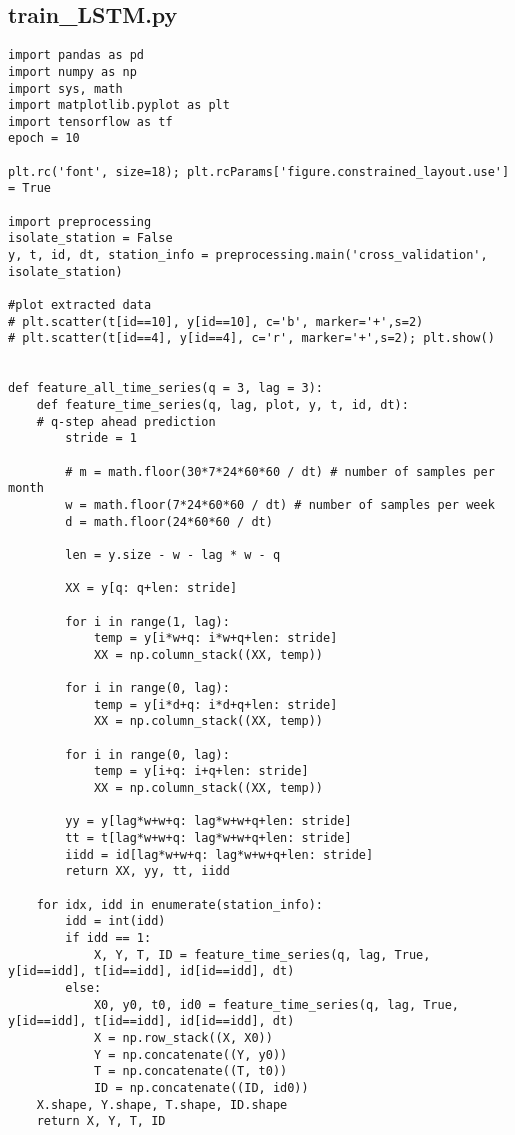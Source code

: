 \subsection{train\_LSTM.py}
\begin{lstlisting}
import pandas as pd
import numpy as np
import sys, math
import matplotlib.pyplot as plt
import tensorflow as tf
epoch = 10

plt.rc('font', size=18); plt.rcParams['figure.constrained_layout.use'] = True

import preprocessing
isolate_station = False
y, t, id, dt, station_info = preprocessing.main('cross_validation', isolate_station)

#plot extracted data
# plt.scatter(t[id==10], y[id==10], c='b', marker='+',s=2)
# plt.scatter(t[id==4], y[id==4], c='r', marker='+',s=2); plt.show()


def feature_all_time_series(q = 3, lag = 3):
    def feature_time_series(q, lag, plot, y, t, id, dt):
    # q-step ahead prediction
        stride = 1

        # m = math.floor(30*7*24*60*60 / dt) # number of samples per month
        w = math.floor(7*24*60*60 / dt) # number of samples per week
        d = math.floor(24*60*60 / dt)

        len = y.size - w - lag * w - q

        XX = y[q: q+len: stride]
            
        for i in range(1, lag):
            temp = y[i*w+q: i*w+q+len: stride]
            XX = np.column_stack((XX, temp))

        for i in range(0, lag):
            temp = y[i*d+q: i*d+q+len: stride]
            XX = np.column_stack((XX, temp))

        for i in range(0, lag):
            temp = y[i+q: i+q+len: stride]
            XX = np.column_stack((XX, temp))

        yy = y[lag*w+w+q: lag*w+w+q+len: stride]
        tt = t[lag*w+w+q: lag*w+w+q+len: stride]
        iidd = id[lag*w+w+q: lag*w+w+q+len: stride]
        return XX, yy, tt, iidd

    for idx, idd in enumerate(station_info):
        idd = int(idd)
        if idd == 1:
            X, Y, T, ID = feature_time_series(q, lag, True, y[id==idd], t[id==idd], id[id==idd], dt)
        else:
            X0, y0, t0, id0 = feature_time_series(q, lag, True, y[id==idd], t[id==idd], id[id==idd], dt)
            X = np.row_stack((X, X0))
            Y = np.concatenate((Y, y0))
            T = np.concatenate((T, t0))
            ID = np.concatenate((ID, id0))
    X.shape, Y.shape, T.shape, ID.shape
    return X, Y, T, ID






\end{lstlisting}
